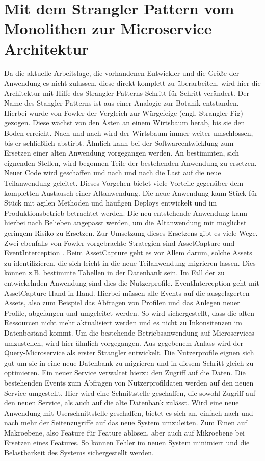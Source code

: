 \section{Mit dem Strangler Pattern vom Monolithen zur Microservice Architektur}
Da die aktuelle Arbeitslage, die vorhandenen Entwickler und die Größe der Anwendung es nicht zulassen, diese direkt komplett zu überarbeiten, wird hier die Architektur mit Hilfe des Strangler Patterns Schritt für Schritt verändert.
Der Name des Stangler Patterns ist aus einer Analogie zur Botanik entstanden. Hierbei wurde von Fowler \cite[][]{Fowler:Strangler} der Vergleich zur Würgefeige (engl. Strangler Fig) gezogen. Diese wächst von den Ästen an einem Wirtsbaum herab, bis sie den Boden erreicht. Nach und nach wird der Wirtsbaum immer weiter umschlossen, bis er schließlich abstirbt.
Ähnlich kann bei der Softwareentwicklung zum Ersetzen einer alten Anwendung vorgegangen werden. An bestimmten, sich eignenden Stellen, wird begonnen Teile der bestehenden Anwendung zu ersetzen. Neuer Code wird geschaffen und nach und nach die Last auf die neue Teilanwendung geleitet.
Dieses Vorgehen bietet viele Vorteile gegenüber dem kompletten Austausch einer Altanwendung. Die neue Anwendung kann Stück für Stück mit agilen Methoden und häufigen Deploys entwickelt und im Produktionsbetrieb betrachtet werden. Die neu entstehende Anwendung kann hierbei nach Belieben angepasst werden, um die Altanwendung mit möglichst geringem Risiko zu Ersetzen.
Zur Umsetzung dieses Ersetzens gibt es viele Wege. Zwei ebenfalls von Fowler vorgebrachte Strategien sind AssetCapture \cite[][]{Fowler:Capture} und EventInterception \cite[][]{Fowler:Interception}.
Beim AssetCapture geht es vor Allem darum, solche Assets zu identifizieren, die sich leicht in die neue Teilanwendung migrieren lassen. Dies können z.B. bestimmte Tabellen in der Datenbank sein. Im Fall der zu entwickelnden Anwendung sind dies die Nutzerprofile.
EventInterception geht mit AssetCapture Hand in Hand. Hierbei müssen alle Events auf die ausgelagerten Assets, also zum Beispiel das Abfragen von Profilen und das Anlegen neuer Profile, abgefangen und umgeleitet werden.
So wird sichergestellt, dass die alten Ressourcen nicht mehr aktualisiert werden und es nicht zu Inkonsitenzen im Datenbestand kommt.
Um die bestehende Betriebsanwendung auf Microservices umzustellen, wird hier ähnlich vorgegangen. Aus gegebenem Anlass wird der Query-Microservice als erster Strangler entwickelt. Die Nutzerprofile eignen sich gut um sie in eine neue Datenbank zu migrieren und in diesem Schritt gleich zu optimieren. Ein neuer Service verwaltet hierzu den Zugriff auf die Daten. Die bestehenden Events zum Abfragen von Nutzerprofildaten werden auf den neuen Service umgestellt. Hier wird eine Schnittstelle geschaffen, die sowohl Zugriff auf den neuen Service, als auch auf die alte Datenbank zulässt. Wird eine neue Anwendung mit Userschnittstelle geschaffen, bietet es sich an, einfach nach und nach mehr der Seitenzugriffe auf das neue System umzuleiten. Zum Einen auf Makroebene, also Feature für Feature ablösen, aber auch auf Mikroebene bei Ersetzen eines Features. So können Fehler im neuen System minimiert und die Belastbarkeit des Systems sichergestellt werden.
